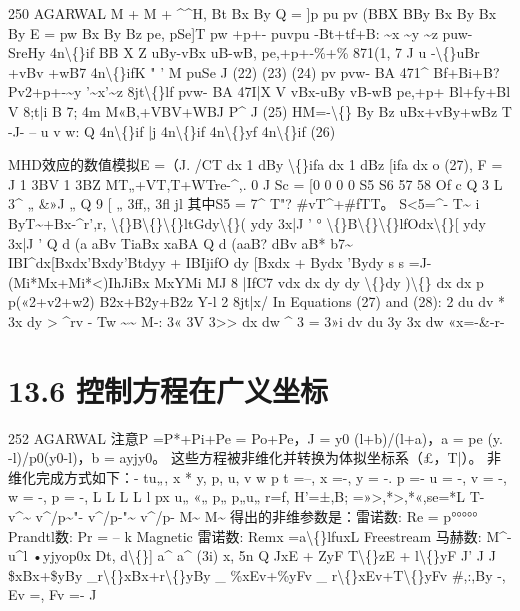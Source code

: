 \documentclass[UTF8,11pt,a4paper,openany,fontset=fandol]{ctexbook}
\begin{document}
250 AGARWAL M + M + \textasciicircum{}\textasciicircum{}H, Bt Bx By Q = ]p pu pv (BBX BBy Bx By Bx By E = pw Bx By Bz pe, pSe]T pw +p+- puvpu -Bt+tf+B: \textasciitilde{}x \textasciitilde{}y \textasciitilde{}z puw- SreHy 4n\textbackslash\{\}if BB X Z uBy-vBx uB-wB, pe,+p+-\%+\% 871(1, 7 J u -\textbackslash\{\}uBr +vBv +wB7 4n\textbackslash\{\}ifK " ' M puSe J (22) (23) (24) pv pvw- BA 471\textasciicircum{} Bf+Bi+B? Pv2+p+-\textasciitilde{}y '\textasciitilde{}x'\textasciitilde{}z 8jt\textbackslash\{\}lf pvw- BA 47I|X V vBx-uBy vB-wB pe,+p+ Bl+fy+Bl V 8;t|i B 7; 4m M«B,+VBV+WBJ P\textasciicircum{} J (25) HM=-\textbackslash\{\} By Bz uBx+vBy+wBz T -J- -- u v w: Q 4n\textbackslash\{\}if |j 4n\textbackslash\{\}if 4n\textbackslash\{\}yf 4n\textbackslash\{\}if (26)

MHD效应的数值模拟E =（J. /CT dx 1 dBy \textbackslash\{\}ifa dx 1 dBz [ifa dx o (27), F = J 1 3BV 1 3BZ MT„+VT,T+WTre-\textasciicircum{},. 0 J Sc = [0 0 0 0 S5 S6 57 58 Of c Q 3 L 3\textasciicircum{} „ \&»J „ Q 9 [ „ 3ff,, 3fl jl 其中S5 = 7\textasciicircum{} T"? \#vT\textasciicircum{}+\#fTT。 S<5=\textasciicircum{}- T\textasciitilde{} i ByT\textasciitilde{}+Bx-\textasciicircum{}r',r, \textbackslash\{\}B\textbackslash\{\}\textbackslash\{\}ltGdy\textbackslash\{\}( ydy 3x|J ' ° \textbackslash\{\}B\textbackslash\{\}\textbackslash\{\}lfOdx\textbackslash\{\}[ ydy 3x|J ' Q d (a aBv TiaBx xaBA Q d (aaB? dBv aB* b7\textasciitilde{} IBI\textasciicircum{}dx[Bxdx'Bxdy'Btdyy + IBIjifO dy [Bxdx + Bydx 'Bydy s s =J-(Mi*Mx+Mi*<)IhJiBx MxYMi MJ 8 |IfC7 vdx dx dy dy \textbackslash\{\}dy )\textbackslash\{\} dx dx p p(«2+v2+w2) B2x+B2y+B2z Y-l 2 8jt|x/ In Equations (27) and (28): 2 du dv * 3x dy > \textasciicircum{}rv - Tw \textasciitilde{}\textasciitilde{} M-: 3« 3V 3>> dx dw \textasciicircum{} 3 = 3»i dv du 3y 3x dw «x=-\&-r-

\section{13.6 控制方程在广义坐标}
252 AGARWAL 注意P =P*+Pi+Pe = Po+Pe，J = y0 (l+b)/(l+a)，a = pe (y. -l)/p0(y0-l)，b = ayjy0。 这些方程被非维化并转换为体拟坐标系（£，T|）。 非维化完成方式如下：- tu„, x * y, p, u, v w p t =--, x =-, y = -. p =- u = -, v = -, w = -, p = -, L L L L l px u„ «„ p„ p„u„ r=f, H'=±,B; =»>,*>,*«,se=*L T- v\textasciicircum{}\textasciitilde{} v\textasciicircum{}/p\textasciitilde{}"- v\textasciicircum{}/p-"\textasciitilde{} v\textasciicircum{}/p- M\textasciitilde{} M\textasciitilde{} 得出的非维参数是：雷诺数: Re = p°°°°° Prandtl数: Pr = -- k Magnetic 雷诺数: Remx =a\textbackslash\{\}lfuxL Freestream 马赫数: M\textasciicircum{}-u\textasciicircum{}l •yjyop0x Dt, d\textbackslash\{\}] a\textasciicircum{} a\textasciicircum{} (3i) x, 5n Q JxE + ZyF T\textbackslash\{\}zE + l\textbackslash\{\}yF J' J J \$xBx+\$yBy \_r\textbackslash\{\}xBx+r\textbackslash\{\}yBy \_ \%xEv+\%yFv \_ r\textbackslash\{\}xEv+T\textbackslash\{\}yFv \#,:,By -, Ev =, Fv =- J
\end{document}
